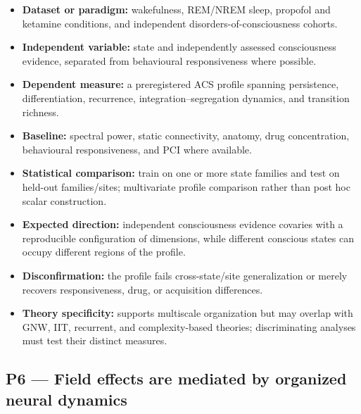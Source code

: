 \documentclass[
  11pt,
  a4paper,
]{article}
\providecommand{\tightlist}{%
  \setlength{\itemsep}{0pt}\setlength{\parskip}{0pt}}
\begin{document}
\begin{itemize}
\tightlist
\item
  \textbf{Dataset or paradigm:} wakefulness, REM/NREM sleep, propofol
  and ketamine conditions, and independent disorders-of-consciousness
  cohorts.
\item
  \textbf{Independent variable:} state and independently assessed
  consciousness evidence, separated from behavioural responsiveness
  where possible.
\item
  \textbf{Dependent measure:} a preregistered ACS profile spanning
  persistence, differentiation, recurrence, integration--segregation
  dynamics, and transition richness.
\item
  \textbf{Baseline:} spectral power, static connectivity, anatomy, drug
  concentration, behavioural responsiveness, and PCI where available.
\item
  \textbf{Statistical comparison:} train on one or more state families
  and test on held-out families/sites; multivariate profile comparison
  rather than post hoc scalar construction.
\item
  \textbf{Expected direction:} independent consciousness evidence
  covaries with a reproducible configuration of dimensions, while
  different conscious states can occupy different regions of the
  profile.
\item
  \textbf{Disconfirmation:} the profile fails cross-state/site
  generalization or merely recovers responsiveness, drug, or acquisition
  differences.
\item
  \textbf{Theory specificity:} supports multiscale organization but may
  overlap with GNW, IIT, recurrent, and complexity-based theories;
  discriminating analyses must test their distinct measures.
\end{itemize}

\subsection{P6 --- Field effects are mediated by organized neural
dynamics}\label{p6-field-effects-are-mediated-by-organized-neural-dynamics}
\end{document}
